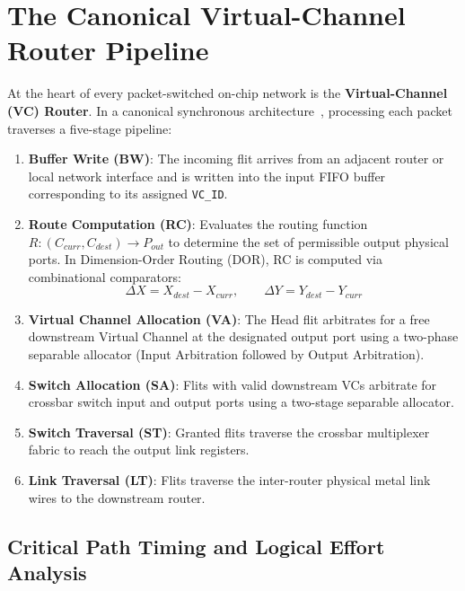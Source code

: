\section{The Canonical Virtual-Channel Router Pipeline}
\label{sec:ch3_pipeline}

At the heart of every packet-switched on-chip network is the \textbf{Virtual-Channel (VC) Router}. In a canonical synchronous architecture~\cite{Peh2001}, processing each packet traverses a five-stage pipeline:
\begin{enumerate}
    \item \textbf{Buffer Write (BW)}: The incoming flit arrives from an adjacent router or local network interface and is written into the input FIFO buffer corresponding to its assigned \texttt{VC\_ID}.
    \item \textbf{Route Computation (RC)}: Evaluates the routing function $R: (C_{curr}, C_{dest}) \to P_{out}$ to determine the set of permissible output physical ports. In Dimension-Order Routing (DOR), RC is computed via combinational comparators:
    \begin{equation}
    \Delta X = X_{dest} - X_{curr}, \qquad \Delta Y = Y_{dest} - Y_{curr}
    \end{equation}
    \item \textbf{Virtual Channel Allocation (VA)}: The Head flit arbitrates for a free downstream Virtual Channel at the designated output port using a two-phase separable allocator (Input Arbitration followed by Output Arbitration).
    \item \textbf{Switch Allocation (SA)}: Flits with valid downstream VCs arbitrate for crossbar switch input and output ports using a two-stage separable allocator.
    \item \textbf{Switch Traversal (ST)}: Granted flits traverse the crossbar multiplexer fabric to reach the output link registers.
    \item \textbf{Link Traversal (LT)}: Flits traverse the inter-router physical metal link wires to the downstream router.
\end{enumerate}

\subsection{Critical Path Timing and Logical Effort Analysis}
\label{subsec:ch3_timing_analysis}

